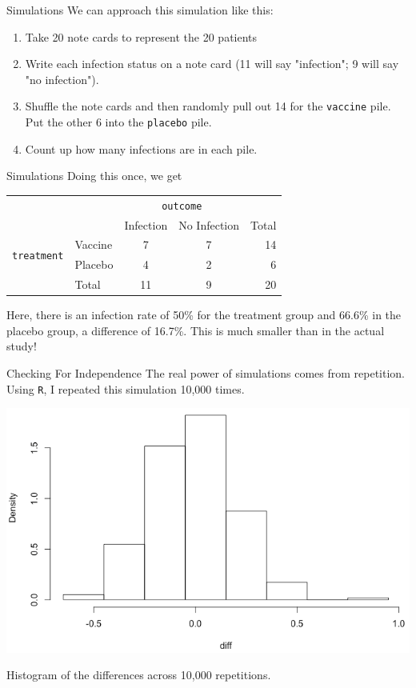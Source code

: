 \begin{frame}{Simulations}
    We can approach this simulation like this:
    \begin{enumerate}
        \item Take 20 note cards to represent the 20 patients \item Write each infection status on a note card (11 will say "infection"; 9 will say "no infection").
        \item Shuffle the note cards and then randomly pull out 14 for the \texttt{vaccine} pile. Put the other 6 into the \texttt{placebo} pile.
        \item Count up how many infections are in each pile.
    \end{enumerate}
\end{frame}

\begin{frame}{Simulations}
    Doing this once, we get
    \begin{center}
        \begin{tabular}{r l cc r}
		& & \multicolumn{2}{c}{{\texttt{outcome}}} & \\
        \cline{3-5}
		& & Infection & No Infection & Total  \\ 
        \cline{2-5}
        \multirow{2}{*}{{\texttt{treatment}}} 
        & Vaccine & 7 & 7 & 14  \\ 
  		& Placebo & 4 & 2 & 6  \\ 
        \cline{2-5}
  		& Total	& 11 & 9 & 20  \\
        \cline{2-5}
    \end{tabular}
    \end{center}
    Here, there is an infection rate of 50\% for the treatment group and 66.6\% in the placebo group, a difference of 16.7\%. This is much smaller than in the actual study!
\end{frame}

\begin{frame}{Checking For Independence}
    The real power of simulations comes from repetition. Using \texttt{R}, I repeated this simulation 10,000 times. 
    \begin{center}
        \includegraphics[scale=0.3]{images/diffhist.png}
    \end{center}
    Histogram of the differences across 10,000 repetitions.
\end{frame}

